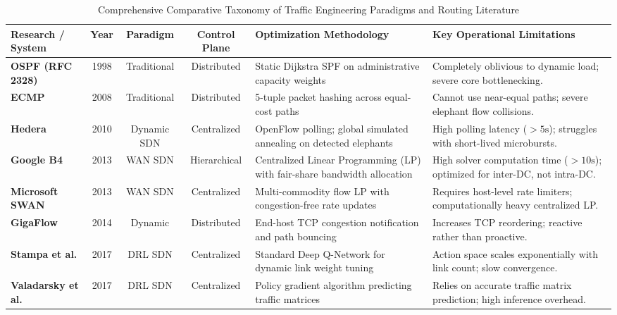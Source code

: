 \begin{table}[htbp]
\centering
\caption{Comprehensive Comparative Taxonomy of Traffic Engineering Paradigms and Routing Literature}
\label{tab:literature_taxonomy}
\scriptsize
\begin{tabularx}{\textwidth}{l c c c p{4.2cm} X}
\toprule
\textbf{Research / System} & \textbf{Year} & \textbf{Paradigm} & \textbf{Control Plane} & \textbf{Optimization Methodology} & \textbf{Key Operational Limitations} \\
\midrule
\textbf{OSPF (RFC 2328)} \cite{moy1998ospf} & 1998 & Traditional & Distributed & Static Dijkstra SPF on administrative capacity weights & Completely oblivious to dynamic load; severe core bottlenecking. \\
\addlinespace
\textbf{ECMP} \cite{al2008scalable} & 2008 & Traditional & Distributed & 5-tuple packet hashing across equal-cost paths & Cannot use near-equal paths; severe elephant flow collisions. \\
\addlinespace
\textbf{Hedera} \cite{al2010hedera} & 2010 & Dynamic SDN & Centralized & OpenFlow polling; global simulated annealing on detected elephants & High polling latency ($>5\text{s}$); struggles with short-lived microbursts. \\
\addlinespace
\textbf{Google B4} \cite{jain2013b4} & 2013 & WAN SDN & Hierarchical & Centralized Linear Programming (LP) with fair-share bandwidth allocation & High solver computation time ($>10\text{s}$); optimized for inter-DC, not intra-DC. \\
\addlinespace
\textbf{Microsoft SWAN} \cite{hong2013achieving} & 2013 & WAN SDN & Centralized & Multi-commodity flow LP with congestion-free rate updates & Requires host-level rate limiters; computationally heavy centralized LP. \\
\addlinespace
\textbf{GigaFlow} \cite{kabbani2014flowbender} & 2014 & Dynamic & Distributed & End-host TCP congestion notification and path bouncing & Increases TCP reordering; reactive rather than proactive. \\
\addlinespace
\textbf{Stampa et al.} \cite{stampa2017deep} & 2017 & DRL SDN & Centralized & Standard Deep Q-Network for dynamic link weight tuning & Action space scales exponentially with link count; slow convergence. \\
\addlinespace
\textbf{Valadarsky et al.} \cite{valadarsky2017learning} & 2017 & DRL SDN & Centralized & Policy gradient algorithm predicting traffic matrices & Relies on accurate traffic matrix prediction; high inference overhead. \\

\end{tabularx}
\end{table}
